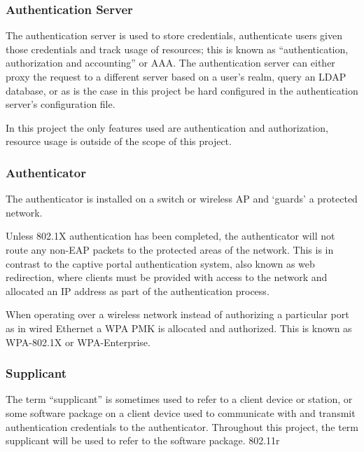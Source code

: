 \documentclass[pdftex, 12pt, a4paper]{article}
\begin{document}

\subsubsection{Authentication Server}
The authentication server is used to store credentials, authenticate users given those credentials and track usage of resources; this is known as ``authentication, authorization and accounting'' or AAA\cite{RFC2865,RFC2866}.  The authentication server can either proxy the request to a different server based on a user's realm, query an LDAP database, or as is the case in this project be hard configured in the authentication server's configuration file.

In this project the only features used are authentication and authorization, resource usage is outside of the scope of this project.

\subsubsection{Authenticator}
The authenticator is installed on a switch or wireless AP and `guards' a protected network.

Unless 802.1X authentication has been completed, the authenticator will not route any non-EAP packets to the protected areas of the network\cite{8021X-book}. This is in contrast to the captive portal authentication system, also known as web redirection, where clients must be provided with access to the network and allocated an IP address as part of the authentication process\cite{wifi-dog}.

When operating over a wireless network instead of authorizing a particular port as in wired Ethernet a WPA PMK is allocated and authorized.  This is known as WPA-802.1X or WPA-Enterprise\cite{IEEE8021X-2004}.
\subsubsection{Supplicant}
The term ``supplicant'' is sometimes used to refer to a client device or station, or some software package on a client device used to communicate with and transmit authentication credentials to the authenticator.  Throughout this project, the term supplicant will be used to refer to the software package.
802.11r
\end{document}
